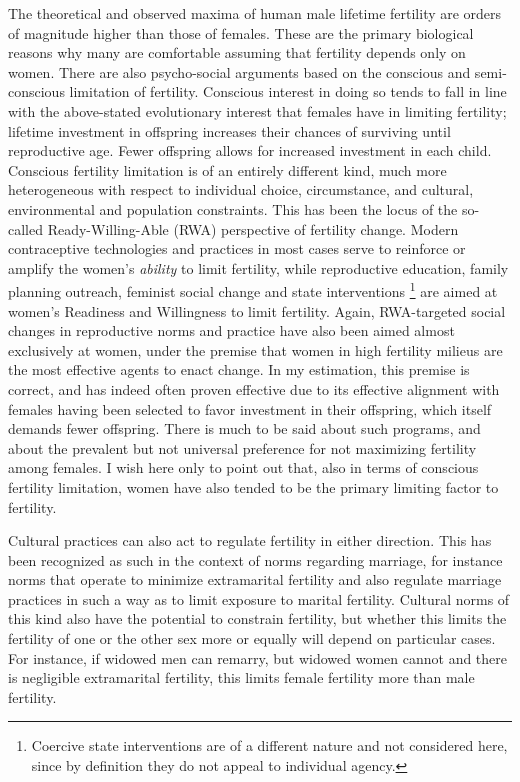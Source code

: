 \documentclass[reqno,12pt,oneside,a4paper]{report} %
\theoremstyle{plain}
\theoremstyle{definition}
\theoremstyle{remark}
\numberwithin{theorem}{chapter}     %
\begin{document}
The theoretical and observed maxima of human male lifetime fertility are orders of magnitude higher than those of females. These are the primary biological reasons why many are comfortable assuming that fertility depends only on women. There are also psycho-social arguments based on the conscious and semi-conscious limitation of fertility. Conscious interest in doing so tends to fall in line with the above-stated evolutionary interest that females have in limiting fertility; lifetime investment in offspring increases their chances of surviving until reproductive age. Fewer offspring allows for increased investment in each child. Conscious fertility limitation is of an entirely different kind, much more heterogeneous with respect to individual choice, circumstance, and cultural, environmental and population constraints. This has been the locus of the so-called Ready-Willing-Able (RWA) perspective of fertility change. Modern contraceptive technologies and practices in most cases serve to reinforce or amplify the women's \textit{ability} to limit fertility, while reproductive education, family planning outreach, feminist social change and state interventions \footnote{Coercive state interventions are of a different nature and not considered here, since by definition they do not appeal to individual agency.} are aimed at women's Readiness and Willingness to limit fertility. Again, RWA-targeted social changes in reproductive norms and practice have also been aimed almost exclusively at women, under the premise that women in high fertility milieus are the most effective agents to enact change. In my estimation, this premise is correct, and has indeed often proven effective due to its effective alignment with females having been selected to favor investment in their offspring, which itself demands fewer offspring. There is much to be said about such programs, and about the prevalent but not universal preference for not maximizing fertility among females. I wish here only to point out that, also in terms of conscious fertility limitation, women have also tended to be the primary limiting factor to fertility.

Cultural practices can also act to regulate fertility in either direction. This has been recognized as such in the context of norms regarding marriage, for instance norms that operate to minimize extramarital fertility and also regulate marriage practices in such a way as to limit exposure to marital fertility. Cultural norms of this kind also have the potential to constrain fertility, but whether this limits the fertility of one or the other sex more or equally will depend on particular cases. For instance, if widowed men can remarry, but widowed women cannot and there is negligible extramarital fertility, this limits female fertility more than male fertility.
\end{document}
